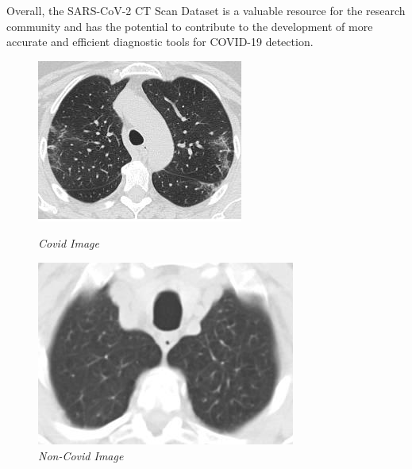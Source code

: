 \documentclass[12pt, a4paper]{report}
\begin{document}
Overall, the SARS-CoV-2 CT Scan Dataset is a valuable resource for the research community and has the potential to contribute to the development of more accurate and efficient diagnostic tools for COVID-19 detection.

\begin{figure}[htbp]
    \centering
    \begin{minipage}{0.4\textwidth}
        \centering
        \includegraphics[width=\linewidth]{report images/image7.png}
        \caption{\textit{Covid Image}}
    \end{minipage}%
    \hspace{0.1\textwidth} %
    \begin{minipage}{0.4\textwidth}
        \centering
        \includegraphics[width=\linewidth]{report images/image8.png}
        \caption{\textit{Non-Covid Image}}
    \end{minipage}
\end{figure}
\end{document}
